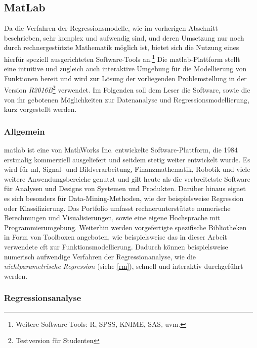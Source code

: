 \subsection{MatLab}
\label{matlab}

Da die Verfahren der Regressionsmodelle, wie im vorherigen Abschnitt beschrieben, sehr komplex und aufwendig sind, und deren Umsetzung nur noch durch rechnergestützte Mathematik möglich ist, bietet sich die Nutzung eines hierfür speziell ausgerichteten Software-Tools an.\footnote{Weitere Software-Tools: R, SPSS, KNIME, SAS, uvm.} Die \gls{matlab}-Plattform stellt eine intuitive und zugleich auch interaktive Umgebung für die Modellierung von Funktionen bereit und wird zur Lösung der vorliegenden Problemstellung in der Version \textit{R2016B}\footnote{Testversion für Studenten} verwendet. Im Folgenden soll dem Leser die Software, sowie die von ihr gebotenen Möglichkeiten zur Datenanalyse und Regressionsmodellierung, kurz vorgestellt werden. 

\subsubsection{Allgemein}
\gls{matlab} ist eine von MathWorks Inc. entwickelte Software-Plattform, die 1984 erstmalig kommerziell ausgeliefert und seitdem stetig weiter entwickelt wurde. Es wird für \gls{ml}, Signal- und Bildverarbeitung, Finanzmathematik, Robotik und viele weitere Anwendungsbereiche genutzt und gilt heute als die verbreitetste Software für Analysen und Designs von Systemen und Produkten. Darüber hinaus eignet es sich besonders für Data-Mining-Methoden, wie der beispielsweise Regression oder Klassifizierung. Das Portfolio umfasst rechnerunterstützte numerische Berechnungen und Visualisierungen, sowie eine eigene Hochsprache mit Programmierumgebung. Weiterhin werden vorgefertigte spezifische Bibliotheken in Form von Toolboxen angeboten, wie beispielsweise das in dieser Arbeit verwendete \gls{cft} zur Funktionsmodellierung. Dadurch können beispielsweise numerisch aufwendige Verfahren der Regressionanalyse, wie die \textit{nichtparametrische Regression} (siehe \vref{rm}), schnell und interaktiv durchgeführt werden. 

\subsubsection{Regressionsanalyse}

